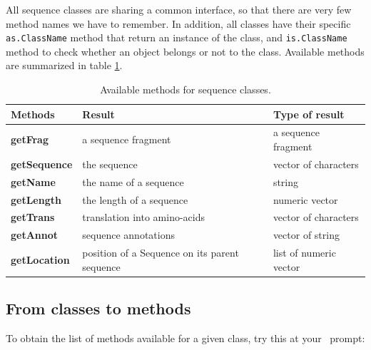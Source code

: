 \documentclass{article}
\begin{document}
All sequence classes are sharing a common interface, so that there are very few method names we 
have to remember. 
In addition, all classes have their specific \texttt{as.ClassName} method that return an 
instance of the class, and \texttt{is.ClassName} method to check whether an object belongs 
or not to the class. Available methods are summarized in table \ref{tabmeth}.

\begin{table} 
\begin{tabular}{lll}
\hline \hline
{\bfseries Methods} & {\bfseries Result} & {\bfseries Type of result} \\
\hline
{\bfseries getFrag} & a sequence fragment & a sequence fragment \\
{\bfseries getSequence} & the sequence & vector of characters \\
{\bfseries getName} & the name of a sequence & string \\
{\bfseries getLength} & the length of a sequence & numeric vector \\
{\bfseries getTrans} & translation into amino-acids & vector of characters \\
{\bfseries getAnnot} & sequence annotations & vector of string \\
{\bfseries getLocation} & position of a Sequence on its parent sequence & list of numeric vector \\
\hline \hline
\end{tabular}
\caption{Available methods for sequence classes.}
\label{tabmeth}
\end{table}

\subsection{From classes to methods}

To obtain the list of methods available for a given class, try this at your \Rlogo{}~prompt:
\end{document}
